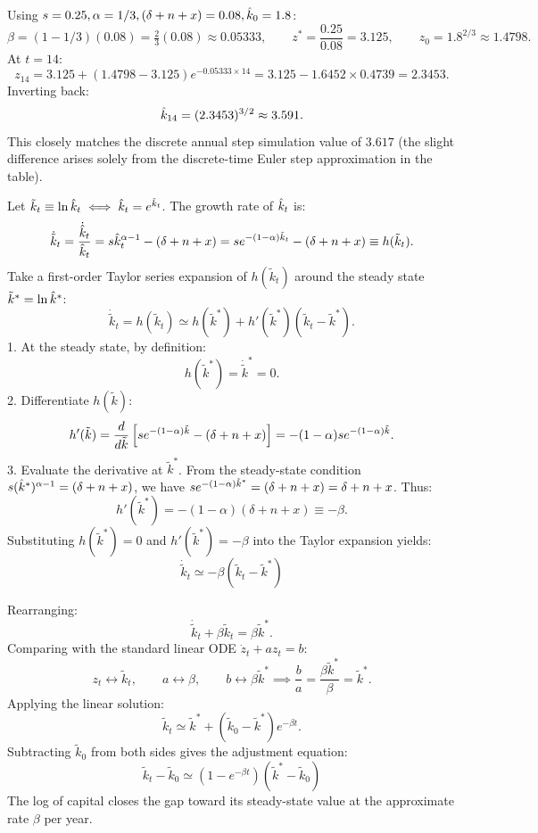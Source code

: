 \documentclass[11pt]{article}
\begin{document}
Using $s = 0.25, \alpha = 1/3, (\delta+n+x) = 0.08, \hat{k}_0 = 1.8$:
\[
\beta = (1 - 1/3)(0.08) = \tfrac{2}{3}(0.08) \approx 0.05333, \qquad z^* = \frac{0.25}{0.08} = 3.125, \qquad z_0 = 1.8^{2/3} \approx 1.4798.
\]
At $t = 14$:
\[
z_{14} = 3.125 + (1.4798 - 3.125)e^{-0.05333 \times 14} = 3.125 - 1.6452 \times 0.4739 = 2.3453.
\]
Inverting back:
\[
\hat{k}_{14} = (2.3453)^{3/2} \approx 3.591.
\]
This closely matches the discrete annual step simulation value of $3.617$ (the slight difference arises solely from the discrete-time Euler step approximation in the table).

Let $\tilde{k}_t \equiv \ln \hat{k}_t \iff \hat{k}_t = e^{\tilde{k}_t}$. The growth rate of $\hat{k}_t$ is:
\[
\dot{\tilde{k}}_t = \frac{\dot{\hat{k}}_t}{\hat{k}_t} = s\hat{k}_t^{\alpha-1} - (\delta+n+x) = s e^{-(1-\alpha)\tilde{k}_t} - (\delta+n+x) \equiv h(\tilde{k}_t).
\]
Take a first-order Taylor series expansion of $h(\tilde{k}_t)$ around the steady state $\tilde{k}^* = \ln\hat{k}^*$:
\[
\dot{\tilde{k}}_t = h(\tilde{k}_t) \simeq h(\tilde{k}^*) + h'(\tilde{k}^*)(\tilde{k}_t - \tilde{k}^*).
\]
1. At the steady state, by definition:
\[
h(\tilde{k}^*) = \dot{\tilde{k}}^* = 0.
\]
2. Differentiate $h(\tilde{k})$:
\[
h'(\tilde{k}) = \frac{d}{d\tilde{k}}\left[s e^{-(1-\alpha)\tilde{k}} - (\delta+n+x)\right] = -(1-\alpha)s e^{-(1-\alpha)\tilde{k}}.
\]
3. Evaluate the derivative at $\tilde{k}^*$. From the steady-state condition $s(\hat{k}^*)^{\alpha-1} = (\delta+n+x)$, we have $s e^{-(1-\alpha)\tilde{k}^*} = (\delta+n+x) = \delta + n + x$. Thus:
\[
h'(\tilde{k}^*) = -(1-\alpha)(\delta + n + x) \equiv -\beta.
\]
Substituting $h(\tilde{k}^*) = 0$ and $h'(\tilde{k}^*) = -\beta$ into the Taylor expansion yields:
\[
\boxed{\dot{\tilde{k}}_t \simeq -\beta(\tilde{k}_t - \tilde{k}^*)}
\]

Rearranging:
\[
\dot{\tilde{k}}_t + \beta \tilde{k}_t = \beta \tilde{k}^*.
\]
Comparing with the standard linear ODE $\dot{z}_t + a z_t = b$:
\[
z_t \leftrightarrow \tilde{k}_t, \qquad a \leftrightarrow \beta, \qquad b \leftrightarrow \beta \tilde{k}^* \implies \frac{b}{a} = \frac{\beta\tilde{k}^*}{\beta} = \tilde{k}^*.
\]
Applying the linear solution:
\[
\tilde{k}_t \simeq \tilde{k}^* + (\tilde{k}_0 - \tilde{k}^*)e^{-\beta t}.
\]
Subtracting $\tilde{k}_0$ from both sides gives the adjustment equation:
\[
\boxed{\tilde{k}_t - \tilde{k}_0 \simeq \left(1 - e^{-\beta t}\right)(\tilde{k}^* - \tilde{k}_0)}
\]
The log of capital closes the gap toward its steady-state value at the approximate rate $\beta$ per year.
\end{document}
